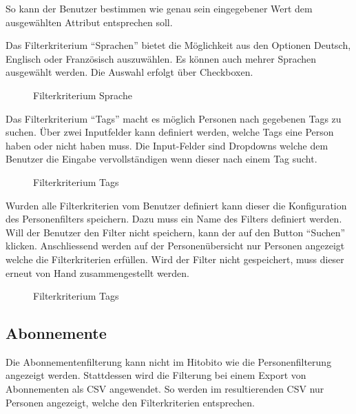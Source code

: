 So kann der Benutzer bestimmen wie genau sein eingegebener Wert dem ausgewählten Attribut entsprechen soll.

\newpage

Das Filterkriterium ``Sprachen'' bietet die Möglichkeit aus den Optionen Deutsch, Englisch oder Französisch auszuwählen.
Es können auch mehrer Sprachen ausgewählt werden. Die Auswahl erfolgt über Checkboxen.

\begin{figure}[h]
   \centering
   \caption{Filterkriterium Sprache}
\end{figure}


Das Filterkriterium ``Tags'' macht es möglich Personen nach gegebenen Tags zu suchen. Über zwei 
Inputfelder kann definiert werden, welche Tags eine Person haben oder nicht haben muss. Die Input-Felder sind
Dropdowns welche dem Benutzer die Eingabe vervollständigen wenn dieser nach einem Tag sucht.

\begin{figure}[h]
   \centering
   \caption{Filterkriterium Tags}
\end{figure}

\newpage

Wurden alle Filterkriterien vom Benutzer definiert kann dieser die Konfiguration des Personenfilters speichern. 
Dazu muss ein Name des Filters definiert werden. Will der Benutzer den Filter nicht speichern, kann der auf den Button ``Suchen'' klicken. Anschliessend
werden auf der Personenübersicht nur Personen angezeigt welche die Filterkriterien erfüllen. Wird der Filter nicht gespeichert, 
muss dieser erneut von Hand zusammengestellt werden.

\begin{figure}[h]
   \centering
   \caption{Filterkriterium Tags}
\end{figure}

\newpage

\subsection{Abonnemente}
Die Abonnementenfilterung kann nicht im Hitobito wie die Personenfilterung angezeigt werden. Stattdessen
wird die Filterung bei einem Export von Abonnementen als CSV angewendet. So werden im resultierenden CSV nur Personen
angezeigt, welche den Filterkriterien entsprechen.

